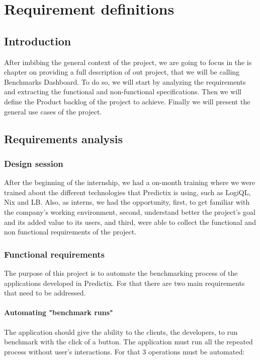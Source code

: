 \chapter{Requirement definitions}

\section*{Introduction}

After imbibing the general context of the project, we are going to focus in
the is chapter on providing a full description of out project, that we will be
calling Benchmarks Dashboard. To do so, we will start by analyzing the
requirements and extracting the  functional and non-functional specifications.
Then we will define the Product backlog of the project to achieve. Finally we
will present the general use cases of the project.

\pagebreak

\section{Requirements analysis}

\subsection{Design session}
After  the beginning of the internship, we had a on-month training where we were
trained about the different technologies that Predictix is using, such as
LogiQL, Nix and LB. Also, as interns, we had the opportunity, first, to get
familiar with the company's working environment, second, understand better the
project's goal and its added value to its users, and third, were able to collect
the functional and non functional requirements of the project.


\subsection{Functional requirements}
The  purpose of this project is to automate the benchmarking process of the
applications developed in Predictix. For that there are two main requirements
that need to be addressed.

\subsubsection{Automating "benchmark runs"}
The application should give the ability to the clients, the developers, to run
benchmark with the click of a button. The application must run all the repeated
process without user's interactions. For that 3 operations must be automated:

